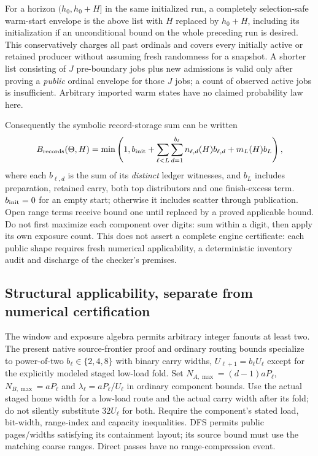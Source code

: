 \documentclass[11pt]{article}
\theoremstyle{definition}
\theoremstyle{remark}
\begin{document}
For a horizon $(h_0,h_0+H]$ in the same initialized run, a completely
selection-safe warm-start envelope is the above list with $H$ replaced
by $h_0+H$, including its initialization if an unconditional bound on the
whole preceding run is desired. This conservatively charges all past
ordinals and covers every initially active or retained producer without
assuming fresh randomness for a snapshot. A shorter list consisting of
$J$ pre-boundary jobs plus new admissions is valid only after proving a
\emph{public} ordinal envelope for those $J$ jobs; a count of observed
active jobs is insufficient. Arbitrary imported warm states have no
claimed probability law here.

Consequently the symbolic record-storage sum can be written
\[
 B_{\rm records}(\Theta,H)=\min\left(1,
 b_{\rm init}+\sum_{\ell<L}\sum_{d=1}^{b_\ell}
 n_{\ell,d}(H)b_{\ell,d}
 +m_L(H)b_L\right),
\]
where each $b_{\ell,d}$ is the sum of its \emph{distinct} ledger witnesses,
and $b_L$ includes preparation, retained carry, both top distributors and
one finish-excess term. $b_{\rm init}=0$ for an empty start; otherwise it
includes scatter through publication. Open range terms receive bound one
until replaced by a proved applicable bound. Do not first maximize each
component over digits: sum within a digit, then apply its own exposure
count. This does not assert a complete engine certificate: each public shape requires fresh numerical applicability, a deterministic
inventory audit and discharge of the checker's premises.

\subsection{Structural applicability, separate from numerical certification}
\label{sec:structural-domain}
The window and exposure algebra permits arbitrary integer fanouts at least
two. The present native source-frontier proof and ordinary routing bounds
specialize to power-of-two $b_\ell\in\{2,4,8\}$ with binary carry widths,
$U_{\ell+1}=b_\ell U_\ell$ except for the explicitly modeled staged
low-load fold. Set $N_{A,\max}=(d-1)aP_\ell$,
$N_{B,\max}=aP_\ell$ and $\lambda_\ell=aP_\ell/U_\ell$ in ordinary
component bounds. Use the actual staged home width for a low-load route
and the actual carry width after its fold; do not silently substitute
$32U_\ell$ for both. Require the component's stated load, bit-width,
range-index and capacity inequalities. DFS permits public pages/widths
satisfying its containment layout; its source bound must use the matching
coarse ranges. Direct passes have no range-compression event.
\end{document}
